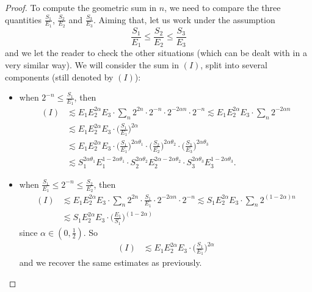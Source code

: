 \documentclass[a4paper,11pt,oneside]{amsart}
\theoremstyle{plain}
\theoremstyle{definition}
\begin{document}
\begin{proof}
To compute the geometric sum in $n$, we need to compare the three quantities $\frac{S_1}{E_1}$, $\frac{S_2}{E_2}$ and $\frac{S_3}{E_3}$. 
Aiming that, let us work under the assumption
\begin{equation} \frac{S_1}{E_1} \leq \frac{S_2}{E_2} \leq \frac{S_3}{E_3} \label{eq:ass}
\end{equation}
and we let the reader to check the other situations (which can be dealt with in a very similar way).
We will consider the sum in $(I)$, split into several components (still denoted by $(I)$):

\begin{itemize}
\item when $2^{-n} \leq \frac{S_1}{E_1}$, then
\begin{align*}
 (I) & \lesssim E_1 E_2^{2\alpha} E_3 \cdot \sum_{n}  2^{2n} \cdot 2^{-n} \cdot 2^{-2\alpha n} \cdot 2^{-n} \lesssim E_1 E_2^{2\alpha} E_3 \cdot \sum_{n}  2^{-2\alpha n} \\
 & \lesssim E_1 E_2^{2\alpha} E_3 \cdot \big(\frac{S_1}{E_1}\big)^{2\alpha} \\
 & \lesssim E_1 E_2^{2\alpha} E_3 \cdot \big(\frac{S_1}{E_1}\big)^{2\alpha\theta_1} \cdot \big(\frac{S_2}{E_2}\big)^{2\alpha \theta_2} \cdot \big(\frac{S_3}{E_3}\big)^{2\alpha \theta_3} \\
 & \lesssim S_1^{2\alpha \theta_1} E_1^{1-2\alpha \theta_1} \cdot S_2^{2\alpha \theta_2} E_2^{2\alpha-2\alpha \theta_2} \cdot S_3^{2\alpha \theta_3} E_3^{1-2\alpha \theta_3}.
\end{align*}

\item when $\frac{S_1}{E_1} \leq 2^{-n} \leq \frac{S_2}{E_2}$, then
\begin{align*}
 (I) & \lesssim E_1 E_2^{2\alpha} E_3 \cdot \sum_{n}  2^{2n} \cdot \frac{S_1}{E_1} \cdot 2^{-2\alpha n} \cdot 2^{-n} \lesssim S_1 E_2^{2\alpha} E_3 \cdot \sum_{n}  2^{(1-2\alpha) n} \\
 & \lesssim S_1 E_2^{2\alpha} E_3 \cdot \big(\frac{E_1}{S_1}\big)^{(1-2\alpha)} 
\end{align*}
since $\alpha\in(0,\frac{1}{2})$. So
\begin{align*} 
(I) & \lesssim E_1 E_2^{2\alpha} E_3 \cdot \big(\frac{S_1}{E_1}\big)^{2\alpha}
\end{align*}
and we recover the same estimates as previously.


\end{itemize}
\end{proof}
\end{document}
